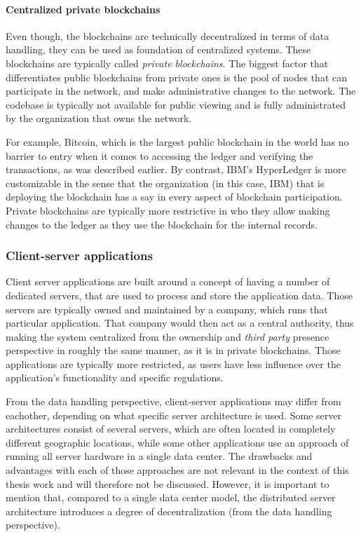 \paragraph{Centralized private blockchains}
Even though, the blockchains are technically decentralized in terms of data handling, they can be used as foundation of centralized systems. These blockchains are typically called \emph{\glspl{private blockchain}}. The biggest factor that differentiates public blockchains from private ones is the pool of nodes that can participate in the network, and make administrative changes to the network. The codebase is typically not available for public viewing and is fully administrated by the organization that owns the network. 

For example, Bitcoin, which is the largest public blockchain in the world has no barrier to entry when it comes to accessing the ledger and verifying the transactions, as was described earlier. By contrast, IBM’s HyperLedger \citep{hyperledger} is more customizable in the sense that the organization (in this case, IBM) that is deploying the blockchain has a say in every aspect of blockchain participation. Private blockchains are typically more restrictive in who they allow making changes to the ledger as they use the blockchain for the internal records.

\subsubsection{Client-server applications} \label{section:clientserver}
Client server applications are built around a concept of having a number of dedicated servers, that are used to process and store the application data. Those servers are typically owned and maintained by a company, which runs that particular application. That company would then act as a central authority, thus making the system centralized from the ownership and \emph{\gls{third party}} presence perspective in roughly the same manner, as it is in private blockchains. Those applications are typically more restricted, as users have less influence over the application's functionality and specific regulations.

From the data handling perspective, client-server applications may differ from eachother, depending on what specific server architecture is used. Some server architectures consist of several servers, which are often located in completely different geographic locations, while some other applications use an approach of running all server hardware in a single data center. The drawbacks and advantages with each of those approaches are not relevant in the context of this thesis work and will therefore not be discussed. However, it is important to mention that, compared to a single data center model, the distributed server architecture introduces a degree of decentralization (from the data handling perspective). 

